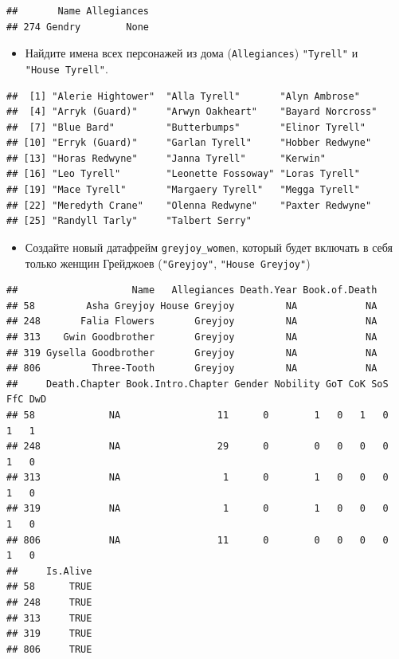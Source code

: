 \documentclass[]{book}
\providecommand{\tightlist}{%
  \setlength{\itemsep}{0pt}\setlength{\parskip}{0pt}}
\begin{document}
\begin{verbatim}
##       Name Allegiances
## 274 Gendry        None
\end{verbatim}

\begin{itemize}
\tightlist
\item
  Найдите имена всех персонажей из дома (\texttt{Allegiances}) \texttt{"Tyrell"} и \texttt{"House\ Tyrell"}.
\end{itemize}

\begin{verbatim}
##  [1] "Alerie Hightower"  "Alla Tyrell"       "Alyn Ambrose"     
##  [4] "Arryk (Guard)"     "Arwyn Oakheart"    "Bayard Norcross"  
##  [7] "Blue Bard"         "Butterbumps"       "Elinor Tyrell"    
## [10] "Erryk (Guard)"     "Garlan Tyrell"     "Hobber Redwyne"   
## [13] "Horas Redwyne"     "Janna Tyrell"      "Kerwin"           
## [16] "Leo Tyrell"        "Leonette Fossoway" "Loras Tyrell"     
## [19] "Mace Tyrell"       "Margaery Tyrell"   "Megga Tyrell"     
## [22] "Meredyth Crane"    "Olenna Redwyne"    "Paxter Redwyne"   
## [25] "Randyll Tarly"     "Talbert Serry"
\end{verbatim}

\begin{itemize}
\tightlist
\item
  Создайте новый датафрейм \texttt{greyjoy\_women}, который будет включать в себя только женщин Грейджоев (\texttt{"Greyjoy"}, \texttt{"House\ Greyjoy"})
\end{itemize}

\begin{verbatim}
##                    Name   Allegiances Death.Year Book.of.Death
## 58         Asha Greyjoy House Greyjoy         NA            NA
## 248       Falia Flowers       Greyjoy         NA            NA
## 313    Gwin Goodbrother       Greyjoy         NA            NA
## 319 Gysella Goodbrother       Greyjoy         NA            NA
## 806         Three-Tooth       Greyjoy         NA            NA
##     Death.Chapter Book.Intro.Chapter Gender Nobility GoT CoK SoS FfC DwD
## 58             NA                 11      0        1   0   1   0   1   1
## 248            NA                 29      0        0   0   0   0   1   0
## 313            NA                  1      0        1   0   0   0   1   0
## 319            NA                  1      0        1   0   0   0   1   0
## 806            NA                 11      0        0   0   0   0   1   0
##     Is.Alive
## 58      TRUE
## 248     TRUE
## 313     TRUE
## 319     TRUE
## 806     TRUE
\end{verbatim}
\end{document}
